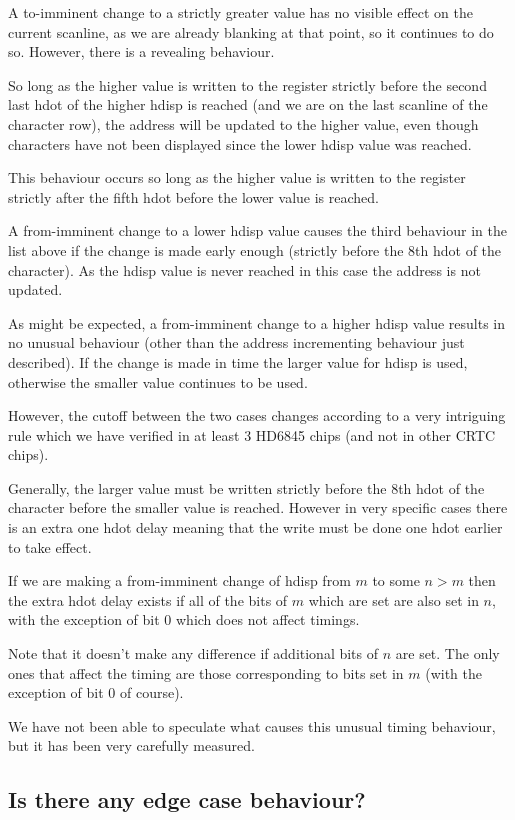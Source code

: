 \documentclass[a4paper,10pt]{amsart}
\begin{document}
A to-imminent change to a strictly greater value has no visible effect on the
current scanline, as we are already blanking at that point, so it continues to
do so. However, there is a revealing behaviour.

So long as the higher value is written to the register strictly before the
second last hdot of the higher hdisp is reached (and we are on the last
scanline of the character row), the address will be updated to the higher value,
even though characters have not been displayed since the lower hdisp value was
reached.

This behaviour occurs so long as the higher value is written to the register
strictly after the fifth hdot before the lower value is reached.

A from-imminent change to a lower hdisp value causes the third behaviour in the
list above if the change is made early enough (strictly before the 8th hdot of
the character). As the hdisp value is never reached in this case the address is
not updated.

As might be expected, a from-imminent change to a higher hdisp value results in
no unusual behaviour (other than the address incrementing behaviour just
described). If the change is made in time the larger value for hdisp is used,
otherwise the smaller value continues to be used.

However, the cutoff between the two cases changes according to a very
intriguing rule which we have verified in at least 3 HD6845 chips (and not in
other CRTC chips).

Generally, the larger value must be written strictly before the 8th hdot of the
character before the smaller value is reached. However in very specific cases
there is an extra one hdot delay meaning that the write must be done one hdot
earlier to take effect.

If we are making a from-imminent change of hdisp from $m$ to some $n > m$ then
the extra hdot delay exists if all of the bits of $m$ which are set are also
set in $n$, with the exception of bit $0$ which does not affect timings.

Note that it doesn't make any difference if additional bits of $n$ are set. The
only ones that affect the timing are those corresponding to bits set in $m$
(with the exception of bit $0$ of course).

We have not been able to speculate what causes this unusual timing behaviour,
but it has been very carefully measured.

\subsection{Is there any edge case behaviour?}
\end{document}
